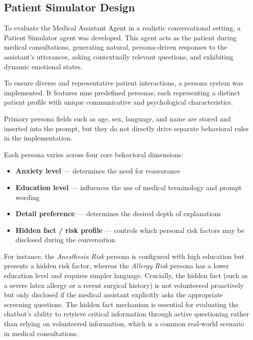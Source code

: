 \subsection{Patient Simulator Design}

To evaluate the Medical Assistant Agent in a realistic conversational setting, a Patient Simulator agent was developed. 
This agent acts as the patient during medical consultations, generating natural, persona-driven responses to the assistant's utterances, asking contextually relevant questions, and exhibiting dynamic emotional states. 

To ensure diverse and representative patient interactions, a persona system was implemented. 
It features nine predefined personas, each representing a distinct patient profile with unique communicative and psychological characteristics. 

Primary persona fields such as age, sex, language, and name are stored and inserted into the prompt, but they do not directly drive separate behavioral rules in the implementation.

Each persona varies across four core behavioral dimensions:
\begin{itemize}
    \item \textbf{Anxiety level} — determines the need for reassurance
    \item \textbf{Education level} — influences the use of medical terminology and prompt wording
    \item \textbf{Detail preference} — determines the desired depth of explanations
    \item \textbf{Hidden fact / risk profile} — controls which personal risk factors may be disclosed during the conversation
\end{itemize}

For instance, the \textit{Anesthesia Risk} persona is configured with high education but presents a hidden risk factor, whereas the \textit{Allergy Risk} persona has a lower education level and requires simpler language. 
Crucially, the hidden fact (such as a severe latex allergy or a recent surgical history) is not volunteered proactively but only disclosed if the medical assistant explicitly asks the appropriate screening questions.
The hidden fact mechanism is essential for evaluating the chatbot's ability to retrieve critical information through active questioning rather than relying on volunteered information, which is a common real-world scenario in medical consultations.


